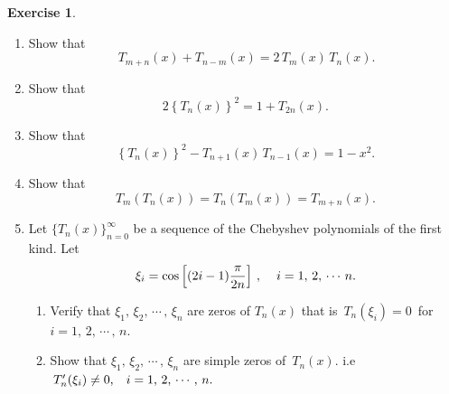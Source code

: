 \documentclass[12pt,a4paper]{report}
\theoremstyle{definition}
\newtheorem{exe}[thm]{Exercise}
\theoremstyle{plain}
\begin{document}
\begin{exe}\textbf{}
\vspace{-4mm}
\begin{enumerate}
\item[(a).]  Show that $$\, T_{m+n}(x) + T_{n-m}(x)  = 2\, T_m(x)\, T_n(x).$$

\item[(b).] Show that $$2\left\{T_n(x)\right\}^2 = 1 + T_{2n}(x).$$

\item[(c).] Show that $$\left\{T_n(x)\right\}^2 - T_{n+1}(x)\, T_{n-1}(x) = 1 - x^2.$$

\item[(d).] Show that $$T_m(T_n(x)) = T_n(T_m(x)) = T_{m+n}(x).$$

\item[(e).] Let $\{T_n(x)\}^{\infty}_{n=0}$ be a sequence of the Chebyshev polynomials of the first kind. Let $$\xi_i = \cos\left[(2i - 1)\frac{\pi}{2n}\right]\, , \hspace{0.4cm} i = 1,\, 2,\, \cdots\, n.$$
   \begin{enumerate}
   \item[(i).] Verify that $\xi_1, \, \xi_2, \, \cdots\, , \, \xi_n$ are zeros of $T_n(x)$ that is $\,T_n(\xi_i) = 0\,$ for $i = 1, \, 2, \, \cdots\, , \, n$.
   
   \item[(ii).] Show that $\xi_1, \, \xi_2, \, \cdots \, , \, \xi_n$ are simple zeros of $\,T_n(x)$. i.e $\,T_n'(\xi_i) \neq
    0, \hspace{0.3cm} i = 1, \, 2,\, \cdots\, , \, n.$
   \end{enumerate}
\end{enumerate}

\end{exe}


\end{document}

